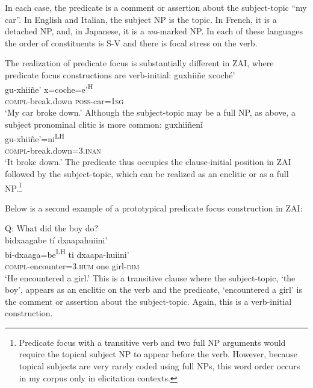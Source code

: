 
In each case, the predicate is a comment or assertion about the subject-topic ``my car''. In English and Italian, the subject NP is the topic. In French, it is a detached NP, and, in Japanese, it is a \textit{wa}-marked NP. In each of these languages the order of constituents is S-V and there is focal stress on the verb. 

The realization of predicate focus is substantially different in ZAI, where predicate focus constructions are verb-initial: 
\ea\label{predfoc1}
\glll guxhii\~{n}e xcoch\'{e}'  \\
gu-xhii\~{n}e' x=coche=e'\textsuperscript{H}  \\
\textsc{compl}-break.down \textsc{poss}-car=\textsc{1sg}  \\
\glt `My car broke down.'
\z
Although the subject-topic may be a full NP, as above, a subject pronominal clitic is more common:
\ea\label{predfoc2}
\glll guxhii\~{n}en\v{i} \\
gu-xhii\~{n}e'=ni\textsuperscript{LH}  \\
\textsc{compl}-break.down=\textsc{3.inan} \\
\glt `It broke down.'
\z
The predicate thus occupies the clause-initial position in ZAI followed by the subject-topic, which can be realized as an enclitic or as a full NP.\footnote{Predicate focus with a transitive verb and two full NP arguments would require the topical subject NP to appear before the verb. However, because topical subjects are very rarely coded using full NPs, this word order occurs in my corpus only in elicitation contexts.}

Below is a second example of a prototypical predicate focus construction in ZAI:

\ea\label{predfocus}
{Q: What did the boy do?} \\
\glll bidxaagabe t\'{i} dxaapahuiini' \\
bi-dxaaga=be\textsuperscript{LH} ti dxaapa-huiini' \\
\textsc{compl}-encounter=\textsc{3.hum} one girl-\textsc{dim} \\
\glt `He encountered a girl.' 
\z
This is a transitive clause where the subject-topic, `the boy', appears as an enclitic on the verb and the predicate, `encountered a girl' is the comment or assertion about the subject-topic. Again, this is a verb-initial construction.

